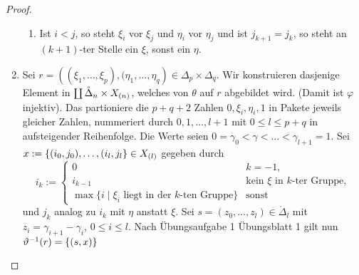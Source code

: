 \begin{proof}
\begin{enumerate}[label=(\alph*)]
\begin{enumerate}[label=(\roman*)]
        \item Ist $i<j$, so steht $\xi_i$ vor $\xi_j$ und $\eta_i$ vor $\eta_j$
          und ist $j_{k+1} = j_k$, so steht an $(k+1)$-ter Stelle
          ein $\xi$, sonst ein $\eta$.
      \end{enumerate}
    \item Sei $r = \left( (\xi_1,\ldots,\xi_p),(\eta_1,\ldots,\eta_q \right)\in
      \Delta_p\times\Delta_q$. Wir konstruieren dasjenige Element in 
      $\coprod \mathring\Delta_n\times X_{(n)}$, welches von $\theta$ auf $r$
      abgebildet wird. (Damit ist $\varphi$ injektiv). Das partioniere die
      $p+q+2$ Zahlen $0,\xi_i,\eta_i,1$ in Pakete jeweils gleicher Zahlen,
      nummeriert durch $0,1,\ldots,l+1$ mit $0\leq l\leq p+q$ in aufsteigender
      Reihenfolge.
      Die Werte seien $0=\gamma_0 < \gamma < \ldots < \gamma_{l+1} = 1$.
      Sei $x := \{(i_0,j_0),\ldots, (i_l,j_l\} \in X_{(l)}$ gegeben durch
      \[i_k := \begin{cases}
        0 & k = -1,\\
        i_{k-1} & \text{kein $\xi$ in $k$-ter Gruppe},\\
        \max\{ i \mid \xi_i \text{ liegt in der $k$-ten Gruppe}\} &
          \text{sonst}
        \end{cases}\]
      und $j_k$ analog zu $i_k$ mit $\eta$ anstatt $\xi$.
      Sei $s = (z_0,\ldots,z_l) \in \mathring\Delta_l$ mit $z_i =
      \gamma_{i+1}-\gamma_i$, $0\leq i\leq l$. Nach Übungsaufgabe 1 Übungsblatt
      1 gilt nun $\vartheta^{-1}(r) = \{(s,x)\}$ 
     
  \end{enumerate}
\end{proof}


